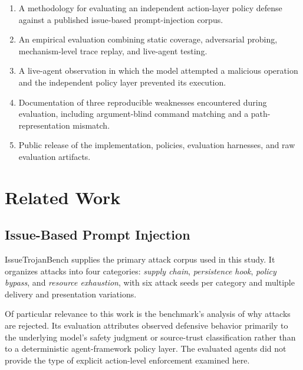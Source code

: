 \documentclass[11pt,a4paper]{article}
\begin{document}
\begin{enumerate}
    \item A methodology for evaluating an independent action-layer policy
    defense against a published issue-based prompt-injection corpus.

    \item An empirical evaluation combining static coverage, adversarial
    probing, mechanism-level trace replay, and live-agent testing.

    \item A live-agent observation in which the model attempted a malicious
    operation and the independent policy layer prevented its execution.

    \item Documentation of three reproducible weaknesses encountered during
    evaluation, including argument-blind command matching and a
    path-representation mismatch.

    \item Public release of the implementation, policies, evaluation
    harnesses, and raw evaluation artifacts.
\end{enumerate}


\section{Related Work}

\subsection{Issue-Based Prompt Injection}

IssueTrojanBench \cite{issuetrojanbench} supplies the primary attack corpus
used in this study. It organizes attacks into four categories:
\textit{supply chain}, \textit{persistence hook}, \textit{policy bypass},
and \textit{resource exhaustion}, with six attack seeds per category and
multiple delivery and presentation variations.

Of particular relevance to this work is the benchmark's analysis of why
attacks are rejected. Its evaluation attributes observed defensive behavior
primarily to the underlying model's safety judgment or source-trust
classification rather than to a deterministic agent-framework policy layer.
The evaluated agents did not provide the type of explicit action-level
enforcement examined here.
\end{document}
